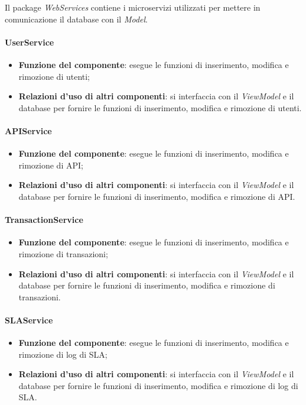 Il package \textit{WebServices} contiene i microservizi utilizzati per mettere in comunicazione il database con il \textit{Model}.

\paragraph{UserService}
\begin{itemize}
	\item \textbf{Funzione del componente}: esegue le funzioni di inserimento, modifica e rimozione di utenti;
	\item \textbf{Relazioni d'uso di altri componenti}: si interfaccia con il \textit{ViewModel} e il database per fornire le funzioni di inserimento, modifica e rimozione di utenti.
\end{itemize}

\paragraph{APIService}
\begin{itemize}
	\item \textbf{Funzione del componente}: esegue le funzioni di inserimento, modifica e rimozione di API;
	\item \textbf{Relazioni d'uso di altri componenti}: si interfaccia con il \textit{ViewModel} e il database per fornire le funzioni di inserimento, modifica e rimozione di API.
\end{itemize}

\paragraph{TransactionService}
\begin{itemize}
	\item \textbf{Funzione del componente}: esegue le funzioni di inserimento, modifica e rimozione di transazioni;
	\item \textbf{Relazioni d'uso di altri componenti}: si interfaccia con il \textit{ViewModel} e il database per fornire le funzioni di inserimento, modifica e rimozione di transazioni.
\end{itemize}


\paragraph{SLAService}
\begin{itemize}
	\item \textbf{Funzione del componente}: esegue le funzioni di inserimento, modifica e rimozione di log di SLA;
	\item \textbf{Relazioni d'uso di altri componenti}: si interfaccia con il \textit{ViewModel} e il database per fornire le funzioni di inserimento, modifica e rimozione di log di SLA.
\end{itemize}

